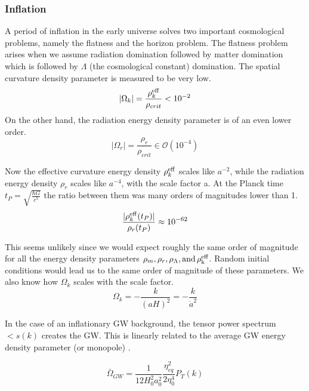 \subsubsection{Inflation}

A period of inflation in the early universe solves two important cosmological problems, namely the flatness and the horizon problem. The flatness problem arises when we assume radiation domination followed by matter domination which is followed by $\Lambda$ (the cosmological constant) domination. The spatial curvature density parameter is measured to be very low. 
\begin{equation}
    |\Omega_k| = \frac{\rho_k^{\rm{eff}}}{\rho_{crit}} < 10^{-2}
\end{equation} 
On the other hand, the radiation energy density parameter is of an even lower order.
\begin{equation}
    |\Omega_r| = \frac{\rho_r}{\rho_{crit}} \in \mathcal{O}(10^{-4}) 
\end{equation}

Now the effective curvature energy density $\rho_{k}^{\rm{eff}}$ scales like $a^{-2}$, while the radiation energy density $\rho_{r}$ scales like $a^{-4}$, with the scale factor a.
At the Planck time $t_P = \sqrt{\frac{\hbar G}{c^5}}$ the ratio between them was many orders of magnitudes lower than 1.
\begin{equation}
    \frac{|\rho_k^{\rm{eff}}(t_P)|}{\rho_r(t_P)} \approx 10^{-62}
\end{equation}

This seems unlikely since we would expect roughly the same order of magnitude for all the energy density parameters $\rho_m, \rho_r, \rho_\Lambda, \rm{ and } \, \rho_k^{eff}$. Random initial conditions would lead us to the same order of magnitude of these parameters.
We also know how $\Omega_k$ scales with the scale factor.
\begin{equation}
    \Omega_k = - \frac{k}{(aH)^2}= -\frac{k}{\dot{a}^2}
\end{equation}

In the case of an inflationary GW background, the tensor power spectrum $<s(k)$ creates the GW. This is linearly related to the average GW energy density parameter (or monopole) \cite{schulze_gw_class_2023}.

\begin{equation}
    \bar{\Omega}_{GW} = \frac{1}{12 H_0^2 a_0^2} \frac{\eta_{eq}^2}{2\eta_0^4} P_T(k)
\end{equation}

